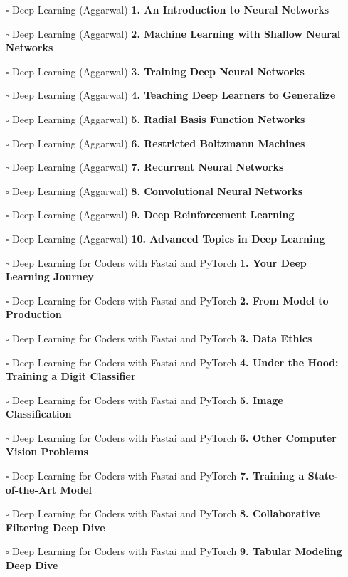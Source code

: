 \documentclass[a4, landscape, 12pt]{article}
\newcommand{\checkbox}{$\square$}%
\begin{document}
\begin{itemize}
{}
\item [\checkbox]  Deep Learning (Aggarwal) \textbf{ 1. An Introduction to Neural Networks
}
\item [\checkbox]  Deep Learning (Aggarwal) \textbf{ 2. Machine Learning with Shallow Neural Networks
}
\item [\checkbox]  Deep Learning (Aggarwal) \textbf{ 3. Training Deep Neural Networks
}
\item [\checkbox]  Deep Learning (Aggarwal) \textbf{ 4. Teaching Deep Learners to Generalize
}
\item [\checkbox]  Deep Learning (Aggarwal) \textbf{ 5. Radial Basis Function Networks
}
\item [\checkbox]  Deep Learning (Aggarwal) \textbf{ 6. Restricted Boltzmann Machines
}
\item [\checkbox]  Deep Learning (Aggarwal) \textbf{ 7. Recurrent Neural Networks
}
\item [\checkbox]  Deep Learning (Aggarwal) \textbf{ 8. Convolutional Neural Networks
}
\item [\checkbox]  Deep Learning (Aggarwal) \textbf{ 9. Deep Reinforcement Learning
}
\item [\checkbox]  Deep Learning (Aggarwal) \textbf{ 10. Advanced Topics in Deep Learning
}
\item [\checkbox]  Deep Learning for Coders with Fastai and PyTorch \textbf{ 1. Your Deep Learning Journey
}
\item [\checkbox]  Deep Learning for Coders with Fastai and PyTorch \textbf{ 2. From Model to Production
}
\item [\checkbox]  Deep Learning for Coders with Fastai and PyTorch \textbf{ 3. Data Ethics
}
\item [\checkbox]  Deep Learning for Coders with Fastai and PyTorch \textbf{ 4. Under the Hood: Training a Digit Classifier
}
\item [\checkbox]  Deep Learning for Coders with Fastai and PyTorch \textbf{ 5. Image Classification
}
\item [\checkbox]  Deep Learning for Coders with Fastai and PyTorch \textbf{ 6. Other Computer Vision Problems
}
\item [\checkbox]  Deep Learning for Coders with Fastai and PyTorch \textbf{ 7. Training a State-of-the-Art Model
}
\item [\checkbox]  Deep Learning for Coders with Fastai and PyTorch \textbf{ 8. Collaborative Filtering Deep Dive
}
\item [\checkbox]  Deep Learning for Coders with Fastai and PyTorch \textbf{ 9. Tabular Modeling Deep Dive
}
\end{itemize}
\end{document}
